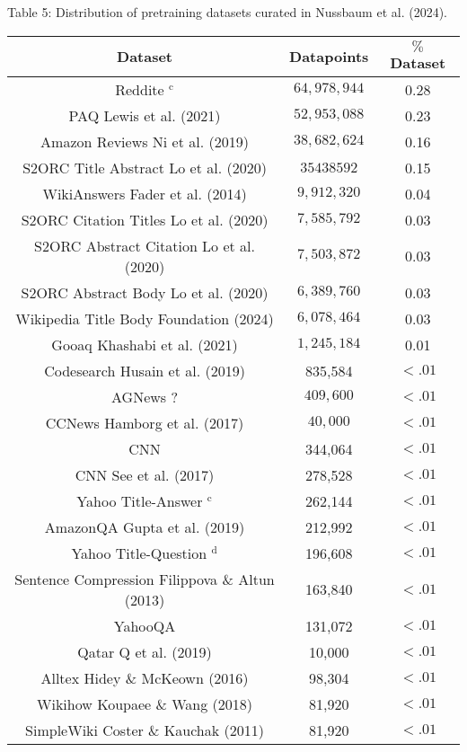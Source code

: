 Table 5: Distribution of pretraining datasets curated in Nussbaum et al. (2024).
\begin{tabular}{|c|c|c|}
\hline Dataset & Datapoints & \(\%\) Dataset \\
\hline Reddite \(^{\mathrm{c}}\) & \(64,978,944\) & 0.28 \\
\hline PAQ Lewis et al. (2021) & \(52,953,088\) & 0.23 \\
\hline Amazon Reviews Ni et al. (2019) & \(38,682,624\) & 0.16 \\
\hline S2ORC Title Abstract Lo et al. (2020) & \(35438592\) & 0.15 \\
\hline WikiAnswers Fader et al. (2014) & \(9,912,320\) & 0.04 \\
\hline S2ORC Citation Titles Lo et al. (2020) & \(7,585,792\) & 0.03 \\
\hline S2ORC Abstract Citation Lo et al. (2020) & \(7,503,872\) & 0.03 \\
\hline S2ORC Abstract Body Lo et al. (2020) & \(6,389,760\) & 0.03 \\
\hline Wikipedia Title Body Foundation (2024) & \(6,078,464\) & 0.03 \\
\hline Gooaq Khashabi et al. (2021) & \(1,245,184\) & 0.01 \\
\hline Codesearch Husain et al. (2019) & 835,584 & \(<.01\) \\
\hline AGNews ? & \(409,600\) & \(<.01\) \\
\hline CCNews Hamborg et al. (2017) & \(40,000\) & \(<.01\) \\
\hline CNN & 344,064 & \(<.01\) \\
\hline CNN See et al. (2017) & 278,528 & \(<.01\) \\
\hline Yahoo Title-Answer \({ }^{\mathrm{c}}\) & 262,144 & \(<.01\) \\
\hline AmazonQA Gupta et al. (2019) & 212,992 & \(<.01\) \\
\hline Yahoo Title-Question \({ }^{\mathrm{d}}\) & 196,608 & \(<.01\) \\
\hline Sentence Compression Filippova \& Altun (2013) & 163,840 & \(<.01\) \\
\hline YahooQA & 131,072 & \(<.01\) \\
\hline Qatar \(\mathrm{Q}\) et al. (2019) & 10,000 & \(<.01\) \\
\hline Alltex Hidey \& McKeown (2016) & 98,304 & \(<.01\) \\
\hline Wikihow Koupaee \& Wang (2018) & 81,920 & \(<.01\) \\
\hline SimpleWiki Coster \& Kauchak (2011) & 81,920 & \(<.01\) \\

\end{tabular}
